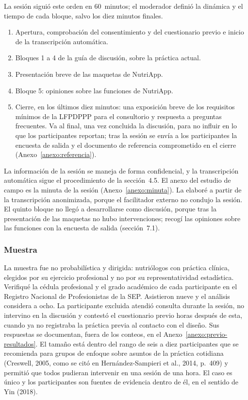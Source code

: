 \documentclass[12pt, a4paper]{article}
\begin{document}
La sesión siguió este orden en 60~minutos; el moderador definió la
dinámica y el tiempo de cada bloque, salvo los diez minutos finales.
 
\begin{enumerate}
  \item Apertura, comprobación del consentimiento y del cuestionario
    previo e inicio de la transcripción automática.
  \item Bloques 1 a 4 de la guía de discusión, sobre
    la práctica actual.
  \item Presentación breve de las maquetas de NutriApp.
  \item Bloque 5: opiniones sobre las funciones de NutriApp.
  \item Cierre, en los últimos diez minutos: una exposición breve de los
    requisitos mínimos de la LFPDPPP para el consultorio y respuesta a
    preguntas frecuentes. Va al final, una vez concluida la discusión,
    para no influir en lo que los participantes reportan; tras la
    sesión se envía a los participantes la encuesta de salida y el
    documento de referencia comprometido en el cierre
    (Anexo~\ref{anexo:referencia}).
\end{enumerate}
 
La información de la sesión se maneja de forma confidencial, y la
transcripción automática sigue el procedimiento de la sección~4.5. El anexo del estudio de campo es la minuta de la sesión (Anexo~\ref{anexo:minuta}). La elaboré a
partir de la transcripción anonimizada, porque el facilitador externo no condujo la
sesión. El quinto bloque no llegó a
desarrollarse como discusión, porque tras la presentación de las
maquetas no hubo intervenciones; recogí las opiniones sobre las funciones con la encuesta de salida (sección~7.1).
 
\subsubsection{Muestra}
 
La muestra fue no probabilística y dirigida: nutriólogos con práctica
clínica, elegidos por su ejercicio profesional y no por su
representatividad estadística. Verifiqué la cédula profesional y
el grado académico de cada participante en el Registro Nacional de
Profesionistas de la SEP. Asistieron nueve y
el análisis considera a ocho. La participante excluida atendió consulta
durante la sesión, no intervino en la discusión y contestó el
cuestionario previo horas después de esta, cuando ya no registraba la
práctica previa al contacto con el diseño. Sus respuestas se documentan,
fuera de los conteos, en el Anexo~\ref{anexo:previo-resultados}. El
tamaño está dentro del rango de seis a diez participantes que se
recomienda para grupos de enfoque sobre asuntos de la práctica cotidiana
(Creswell, 2005, como se citó en Hernández-Sampieri et al., 2014,
p.~409) y permitió que todos pudieran intervenir en una sesión de una hora. El
caso es único y los participantes son fuentes de evidencia dentro de él,
en el sentido de Yin (2018).
 
\end{document}
